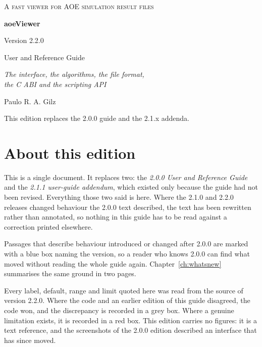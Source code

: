 \documentclass[11pt,a4paper,oneside]{report}
\newcommand{\appver}{2.2.0}
\begin{document}
\begin{titlepage}
\centering
\vspace*{3cm}
{\small\scshape\color{aoeaccent} A fast viewer for AOE simulation result files\par}
\vspace{2.2cm}
{\Huge\bfseries aoeViewer\par}
\vspace{0.5cm}
{\Large Version \appver\par}
\vspace{2.4cm}
{\LARGE User and Reference Guide\par}
\vspace{0.6cm}
{\large\itshape The interface, the algorithms, the file format,\\
the C ABI and the scripting API\par}
\vspace{3cm}
{\large Paulo R. A. Gilz\par}
\vfill
{\small This edition replaces the 2.0.0 guide and the 2.1.x addenda.\par}
\end{titlepage}

\tableofcontents
\clearpage

\chapter*{About this edition}

This is a single document. It replaces two: the \emph{2.0.0 User and Reference
Guide} and the \emph{2.1.1 user-guide addendum}, which existed only because
the guide had not been revised. Everything those two said is here. Where the
2.1.0 and \appver{} releases changed behaviour the 2.0.0 text described, the
text has been rewritten rather than annotated, so nothing in this guide has to
be read against a correction printed elsewhere.

Passages that describe behaviour introduced or changed after 2.0.0 are marked
with a blue box naming the version, so a reader who knows 2.0.0 can find what
moved without reading the whole guide again. Chapter~\ref{ch:whatsnew}
summarises the same ground in two pages.

Every label, default, range and limit quoted here was read from the source of
version \appver. Where the code and an earlier edition of this guide
disagreed, the code won, and the discrepancy is recorded in a grey box. Where a
genuine limitation exists, it is recorded in a red box. This edition carries no
figures: it is a text reference, and the screenshots of the 2.0.0 edition
described an interface that has since moved.
\end{document}
